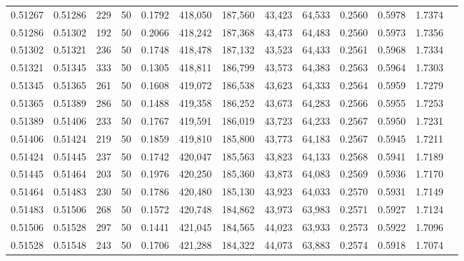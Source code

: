 \begin{tabular}{rrrrrrrrrrrrr}
0.51267 & 0.51286 &   229 &  50 &                                     0.1792 & 418,050 & 187,560 &  43,423 &  64,533 & 0.2560 & 0.5978 & 1.7374 \\
0.51286 & 0.51302 &   192 &  50 &                                     0.2066 & 418,242 & 187,368 &  43,473 &  64,483 & 0.2560 & 0.5973 & 1.7356 \\
0.51302 & 0.51321 &   236 &  50 &                                     0.1748 & 418,478 & 187,132 &  43,523 &  64,433 & 0.2561 & 0.5968 & 1.7334 \\
0.51321 & 0.51345 &   333 &  50 &                                     0.1305 & 418,811 & 186,799 &  43,573 &  64,383 & 0.2563 & 0.5964 & 1.7303 \\
0.51345 & 0.51365 &   261 &  50 &                                     0.1608 & 419,072 & 186,538 &  43,623 &  64,333 & 0.2564 & 0.5959 & 1.7279 \\
0.51365 & 0.51389 &   286 &  50 &                                     0.1488 & 419,358 & 186,252 &  43,673 &  64,283 & 0.2566 & 0.5955 & 1.7253 \\
0.51389 & 0.51406 &   233 &  50 &                                     0.1767 & 419,591 & 186,019 &  43,723 &  64,233 & 0.2567 & 0.5950 & 1.7231 \\
0.51406 & 0.51424 &   219 &  50 &                                     0.1859 & 419,810 & 185,800 &  43,773 &  64,183 & 0.2567 & 0.5945 & 1.7211 \\
0.51424 & 0.51445 &   237 &  50 &                                     0.1742 & 420,047 & 185,563 &  43,823 &  64,133 & 0.2568 & 0.5941 & 1.7189 \\
0.51445 & 0.51464 &   203 &  50 &                                     0.1976 & 420,250 & 185,360 &  43,873 &  64,083 & 0.2569 & 0.5936 & 1.7170 \\
0.51464 & 0.51483 &   230 &  50 &                                     0.1786 & 420,480 & 185,130 &  43,923 &  64,033 & 0.2570 & 0.5931 & 1.7149 \\
0.51483 & 0.51506 &   268 &  50 &                                     0.1572 & 420,748 & 184,862 &  43,973 &  63,983 & 0.2571 & 0.5927 & 1.7124 \\
0.51506 & 0.51528 &   297 &  50 &                                     0.1441 & 421,045 & 184,565 &  44,023 &  63,933 & 0.2573 & 0.5922 & 1.7096 \\
0.51528 & 0.51548 &   243 &  50 &                                     0.1706 & 421,288 & 184,322 &  44,073 &  63,883 & 0.2574 & 0.5918 & 1.7074 \\

\end{tabular}
